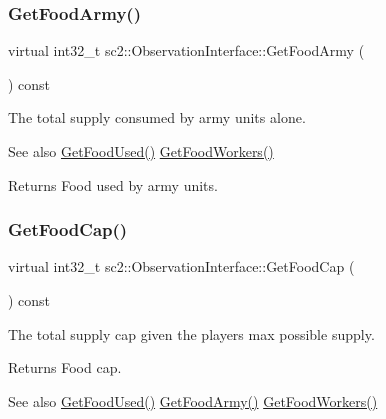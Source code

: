 \subsubsection{\texorpdfstring{Get\+Food\+Army()}{GetFoodArmy()}}
{\footnotesize\ttfamily virtual int32\+\_\+t sc2\+::\+Observation\+Interface\+::\+Get\+Food\+Army (\begin{DoxyParamCaption}{ }\end{DoxyParamCaption}) const\hspace{0.3cm}{\ttfamily [pure virtual]}}

The total supply consumed by army units alone. \begin{DoxySeeAlso}{See also}
\hyperlink{classsc2_1_1_observation_interface_a77f230bd98b95599338c7788aee00d26}{Get\+Food\+Used()} \hyperlink{classsc2_1_1_observation_interface_a19f0bdd8df647ee935dbe6f3c50d64e7}{Get\+Food\+Workers()} 
\end{DoxySeeAlso}
\begin{DoxyReturn}{Returns}
Food used by army units. 
\end{DoxyReturn}
\mbox{\label{classsc2_1_1_observation_interface_ac556f665e6920eb853711c1b7d4d54b3}} 
\subsubsection{\texorpdfstring{Get\+Food\+Cap()}{GetFoodCap()}}
{\footnotesize\ttfamily virtual int32\+\_\+t sc2\+::\+Observation\+Interface\+::\+Get\+Food\+Cap (\begin{DoxyParamCaption}{ }\end{DoxyParamCaption}) const\hspace{0.3cm}{\ttfamily [pure virtual]}}

The total supply cap given the players max possible supply. \begin{DoxyReturn}{Returns}
Food cap. 
\end{DoxyReturn}
\begin{DoxySeeAlso}{See also}
\hyperlink{classsc2_1_1_observation_interface_a77f230bd98b95599338c7788aee00d26}{Get\+Food\+Used()} \hyperlink{classsc2_1_1_observation_interface_a7fd13a2a776f08f714d941ba9e4bafa8}{Get\+Food\+Army()} \hyperlink{classsc2_1_1_observation_interface_a19f0bdd8df647ee935dbe6f3c50d64e7}{Get\+Food\+Workers()} 
\end{DoxySeeAlso}
\mbox{\label{classsc2_1_1_observation_interface_a77f230bd98b95599338c7788aee00d26}} 
